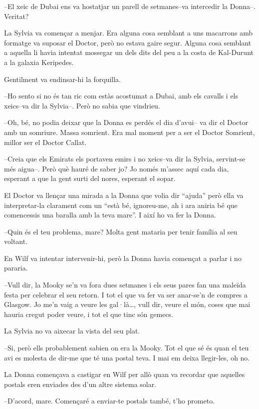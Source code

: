 --El xeic de Dubai ens va hostatjar un parell de setmanes--va intercedir
la Donna--. Veritat?

La Sylvia va començar a menjar. Era alguna cosa semblant a uns macarrons
amb formatge va suposar el Doctor, però no estava gaire segur. Alguna
cosa semblant a aquella li havia intentat mossegar un dels dits del peu
a la costa de Kal-Durunt a la galaxia Keripedes.

Gentilment va endinsar-hi la forquilla.

--Ho sento si no és tan ric com estàs acostumat a Dubai, amb els cavalls
i els xeics--va dir la Sylvia--. Però no sabia que vindrieu.

--Oh, bé, no podia deixar que la Donna es perdés el dia d'avui-- va dir
el Doctor amb un somriure. Massa somrient. Era mal moment per a ser el
Doctor Somrient, millor ser el Doctor Callat.

--Creia que els Emirats els portaven emirs i no xeics--va dir la Sylvia,
servint-se més aigua--. Però què hauré de saber jo? Jo només m'assec
aquí cada dia, esperant a que la gent surti del nores, esperant el
sopar.

El Doctor va llençar una mirada a la Donna que volia dir ``ajuda'' però
ella va interpretar-la clarament com un ``està bé, ignoreu-me, ah i ara
aniria bé que comencessis una baralla amb la teva mare''. I així ho va
fer la Donna.

--Quin és el teu problema, mare? Molta gent mataria per tenir família al
seu voltant.

En Wilf va intentar intervenir-hi, però la Donna havia començat a parlar
i no pararia.

--Vull dir, la Mooky se'n va fora dues setmanes i els seus pares fan una
maleïda festa per celebrar el seu retorn. I tot el que va fer va ser
anar-se'n de compres a Glasgow. Jo me'n vaig a veure les gal·là\ldots{},
vull dir, veure el món, coses que mai hauria cregut poder veure, i tot
el que tinc són gemecs.

La Sylvia no va aixecar la vista del seu plat.

--Si, però ells probablement sabien on era la Mooky. Tot el que sé és
quan el teu avi es molesta de dir-me que té una postal teva. I mai em
deixa llegir-les, oh no.

La Donna començava a castigar en Wilf per allò quan va recordar que
aquelles postals eren enviades des d'un altre sistema solar.

--D'acord, mare. Començaré a enviar-te postals també, t'ho prometo.

